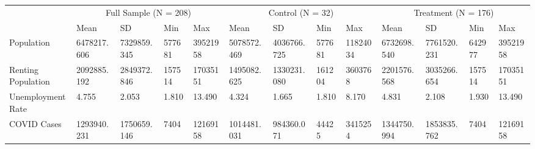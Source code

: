 \begin{tabular}{lllllllllllll}
\toprule
 & \multicolumn{4}{c}{Full Sample (N = 208)} & \multicolumn{4}{c}{Control (N = 32)} & \multicolumn{4}{c}{Treatment (N = 176)} \\
 & Mean & SD & Min & Max & Mean & SD & Min & Max & Mean & SD & Min & Max \\
\midrule
Population & 6478217.606 & 7329859.345 & 577681 & 39521958 & 5078572.469 & 4036766.725 & 577681 & 11824034 & 6732698.540 & 7761520.231 & 642977 & 39521958 \\
Renting Population & 2092885.192 & 2849372.846 & 157514 & 17035151 & 1495082.625 & 1330231.080 & 161204 & 3603768 & 2201576.568 & 3035266.654 & 157514 & 17035151 \\
Unemployment Rate & 4.755 & 2.053 & 1.810 & 13.490 & 4.324 & 1.665 & 1.810 & 8.170 & 4.831 & 2.108 & 1.930 & 13.490 \\
COVID Cases & 1293940.231 & 1750659.146 & 7404 & 12169158 & 1014481.031 & 984360.071 & 44425 & 3415254 & 1344750.994 & 1853835.762 & 7404 & 12169158 \\
\bottomrule
\end{tabular}
